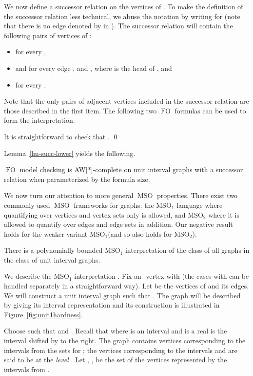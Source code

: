 \documentclass{CSML}
\newcommand{\FO}{\ensuremath{\operatorname{FO}}\xspace}
\newcommand{\MSO}{\ensuremath{\operatorname{MSO}}\xspace}
\newcommand{\MSOi}{\ensuremath{\operatorname{MSO_1}}\xspace}
\newcommand{\MSOii}{\ensuremath{\operatorname{MSO_2}}\xspace}
\theoremstyle{plain}\newtheorem{claim}[thm]{Claim}
\begin{document}
We now define a successor relation on the vertices of .
To make the definition of the successor relation less technical,
we abuse the notation by writing  for  (note that there is no edge denoted by  in ).
The successor relation will contain the following pairs of vertices of :
\begin{itemize}
\item  for every ,
\item  and  for every edge ,  and ,
      where  is the head of , and
\item  for every .
\end{itemize}
Note that the only pairs of adjacent vertices included in the successor relation are those described in the first item.
The following two \FO formulas can be used to form the interpretation.

It is straightforward to check that .
\qed

Lemma~\ref{lm-succ-lower} yields the following.

\begin{cor}
\label{cor-succFO}
\FO model checking is AW[*]-complete on unit interval graphs with a successor relation
when parameterized by the formula size.
\end{cor}

We now turn our attention to more general \MSO properties.
There exist two commonly used \MSO frameworks for graphs:
the \MSOi language where quantifying over vertices and vertex sets only is allowed, and
\MSOii where it is allowed to quantify over edges and edge sets in addition.
Our negative result holds for the weaker variant \MSOi (and so also holds for \MSOii).

\begin{lem}
\label{lem:1MSO1}
There is a polynomially bounded \MSOi interpretation of the class of all graphs in the class of unit interval graphs.
\end{lem}

\proof
We describe the \MSOi interpretation .
Fix an -vertex  with  (the cases with  can be handled separately in a straightforward way).
Let  be the vertices of  and  its edges.
We will construct a unit interval graph  such that .
The graph  will be described by giving its interval representation and
its construction is illustrated in Figure~\ref{fig:unit1hardness}.

Choose  such that  and
.
Recall that  where  is an interval and  is a real
is the interval  shifted by  to the right.
The graph  contains  vertices corresponding to the intervals from the sets  for ;
the vertices corresponding to the intervals  and  are said to be at the {\em level }.
Let , , be the set of the  vertices represented by the intervals from .
\end{document}
